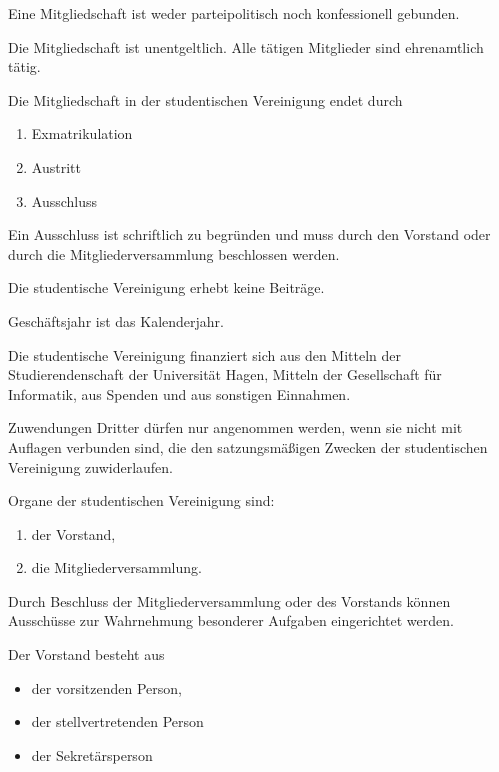\begin{contract}
Eine Mitgliedschaft ist weder parteipolitisch noch konfessionell gebunden.

Die Mitgliedschaft ist unentgeltlich. Alle tätigen Mitglieder sind ehrenamtlich tätig.

\label{sec:mitgliedschaftsende}

Die Mitgliedschaft in der studentischen Vereinigung endet durch
\begin{enumerate}
    \item Exmatrikulation
    \item Austritt
    \item Ausschluss
\end{enumerate}
Ein Ausschluss ist schriftlich zu begründen und muss durch den Vorstand oder durch die Mitgliederversammlung beschlossen werden.

\label{sec:beiträge}

Die studentische Vereinigung erhebt keine Beiträge.


\label{sec:geschäftsjahr}

Geschäftsjahr ist das Kalenderjahr.


Die studentische Vereinigung finanziert sich aus den Mitteln der Studierendenschaft der Universität Hagen, Mitteln der Gesellschaft für Informatik, aus Spenden und aus sonstigen Einnahmen.

Zuwendungen Dritter dürfen nur angenommen werden, wenn sie nicht mit Auflagen verbunden sind, die den satzungsmäßigen Zwecken der studentischen Vereinigung zuwiderlaufen.


\label{sec:organe}

Organe der studentischen Vereinigung sind:
\begin{enumerate}
    \item der Vorstand,
    \item die Mitgliederversammlung.
\end{enumerate}
Durch Beschluss der Mitgliederversammlung oder des Vorstands können Ausschüsse zur Wahrnehmung besonderer Aufgaben eingerichtet werden.


\label{sec:vorstand}


Der Vorstand besteht aus 
\begin{itemize}
    \item der vorsitzenden Person,
    \item der stellvertretenden Person
    \item der Sekretärsperson
\end{itemize}  \label{sec:vorstand-posten}


\end{contract}
